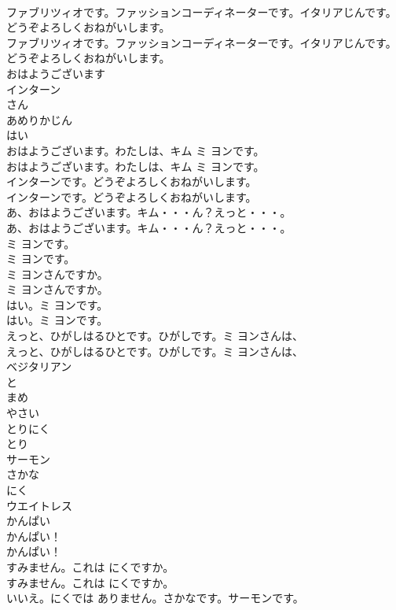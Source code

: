 \documentclass[8pt]{extreport}
\begin{document}
\begin{CJK}{UTF8}{min}
\\	ファブリツィオです。ファッションコーディネーターです。イタリアじんです。どうぞよろしくおねがいします。	
\\	ファブリツィオです。ファッションコーディネーターです。イタリアじんです。どうぞよろしくおねがいします。 
\\	おはようございます
\\	インターン
\\	さん
\\	あめりかじん
\\	はい
\\	おはようございます。わたしは、キム ミ ヨンです。	
\\	おはようございます。わたしは、キム ミ ヨンです。 
\\	インターンです。どうぞよろしくおねがいします。	
\\	インターンです。どうぞよろしくおねがいします。 
\\	あ、おはようございます。キム・・・ん？えっと・・・。	
\\	あ、おはようございます。キム・・・ん？えっと・・・。 
\\	ミ ヨンです。	
\\	ミ ヨンです。 
\\	ミ ヨンさんですか。	
\\	ミ ヨンさんですか。 
\\	はい。ミ ヨンです。	
\\	はい。ミ ヨンです。 
\\	えっと、ひがしはるひとです。ひがしです。ミ ヨンさんは、	
\\	えっと、ひがしはるひとです。ひがしです。ミ ヨンさんは、 
\\	ベジタリアン
\\	と
\\	まめ
\\	やさい
\\	とりにく
\\	とり
\\	サーモン
\\	さかな
\\	にく
\\	ウエイトレス
\\	かんぱい
\\	かんぱい！	
\\	かんぱい！ 
\\	すみません。これは にくですか。	
\\	すみません。これは にくですか。 
\\	いいえ。にくでは ありません。さかなです。サーモンです。	

\end{CJK}
\end{document}
